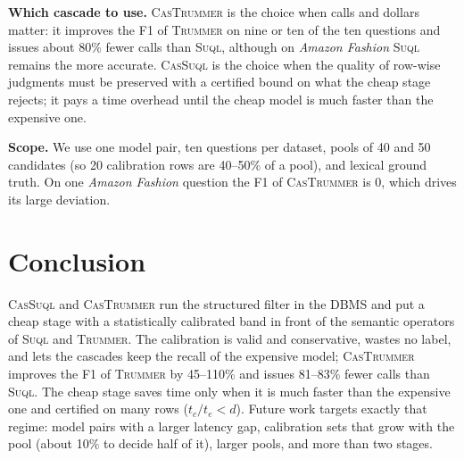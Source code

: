 \documentclass[sigconf]{acmart}
\begin{document}
\textbf{Which cascade to use.} \textsc{CasTrummer} is the choice when calls and dollars matter: it improves the F1 of \textsc{Trummer} on nine or ten of the ten questions and issues about 80\% fewer calls than \textsc{Suql}, although on \textit{Amazon Fashion} \textsc{Suql} remains the more accurate. \textsc{CasSuql} is the choice when the quality of row-wise judgments must be preserved with a certified bound on what the cheap stage rejects; it pays a time overhead until the cheap model is much faster than the expensive one.

\textbf{Scope.} We use one model pair, ten questions per dataset, pools of 40 and 50 candidates (so 20 calibration rows are 40--50\% of a pool), and lexical ground truth. On one \textit{Amazon Fashion} question the F1 of \textsc{CasTrummer} is 0, which drives its large deviation.

\section{Conclusion}
\label{sec:conclusion}

\textsc{CasSuql} and \textsc{CasTrummer} run the structured filter in the DBMS and put a cheap stage with a statistically calibrated band in front of the semantic operators of \textsc{Suql} and \textsc{Trummer}. The calibration is valid and conservative, wastes no label, and lets the cascades keep the recall of the expensive model; \textsc{CasTrummer} improves the F1 of \textsc{Trummer} by 45--110\% and issues 81--83\% fewer calls than \textsc{Suql}. The cheap stage saves time only when it is much faster than the expensive one and certified on many rows ($t_c/t_e<d$). Future work targets exactly that regime: model pairs with a larger latency gap, calibration sets that grow with the pool (about 10\% to decide half of it), larger pools, and more than two stages.



\end{document}
